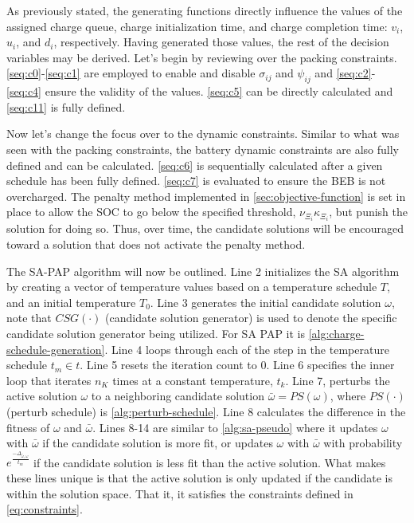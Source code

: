 \documentclass[11pt,a4paper,final]{article}
\newcommand{\Tau}{T}                        %
\begin{document}
As previously stated, the generating functions directly influence the values of the assigned charge queue, charge
initialization time, and charge completion time: \(v_i\), \(u_i\), and \(d_i\), respectively. Having generated those values,
the rest of the decision variables may be derived. Let's begin by reviewing over the packing constraints.
\ref{seq:c0}-\ref{seq:c1} are employed to enable and disable \(\sigma_{ij}\) and \(\psi_{ij}\) and \ref{seq:c2}-\ref{seq:c4} ensure
the validity of the values. \ref{seq:c5} can be directly calculated and \ref{seq:c11} is fully defined.

Now let's change the focus over to the dynamic constraints. Similar to what was seen with the packing constraints, the
battery dynamic constraints are also fully defined and can be calculated. \ref{seq:c6} is sequentially calculated after
a given schedule has been fully defined. \ref{seq:c7} is evaluated to ensure the BEB is not overcharged. The penalty
method implemented in \ref{sec:objective-function} is set in place to allow the SOC to go below the specified threshold,
\(\nu_{\Xi_i} \kappa_{\Xi_i}\), but punish the solution for doing so. Thus, over time, the candidate solutions will be encouraged
toward a solution that does not activate the penalty method.

The SA-PAP algorithm will now be outlined. Line 2 initializes the SA algorithm by creating a vector of temperature
values based on a temperature schedule \(\Tau\), and an initial temperature \(\Tau_0\). Line 3 generates the initial
candidate solution \(\omega\), note that \(CSG(\cdot)\) (candidate solution generator) is used to denote the specific candidate
solution generator being utilized. For SA PAP it is \ref{alg:charge-schedule-generation}. Line 4 loops through each of
the step in the temperature schedule \(t_m \in t\). Line 5 resets the iteration count to 0. Line 6 specifies the inner loop
that iterates \(n_K\) times at a constant temperature, \(t_k\). Line 7, perturbs the active solution \(\omega\) to a neighboring
candidate solution \(\bar{\omega} = PS(\omega)\), where \(PS(\cdot)\) (perturb schedule) is \ref{alg:perturb-schedule}. Line 8 calculates
the difference in the fitness of \(\omega\) and \(\bar{\omega}\). Lines 8-14 are similar to \ref{alg:sa-pseudo} where it updates \(\omega\)
with \(\bar{\omega}\) if the candidate solution is more fit, or updates \(\omega\) with \(\bar{\omega}\) with probability
\(e^{\frac{-\Delta_{\bar{\omega},\omega}}{t_m}}\) if the candidate solution is less fit than the active solution. What makes these lines
unique is that the active solution is only updated if the candidate is within the solution space. That it, it satisfies
the constraints defined in \ref{eq:constraints}.
\end{document}
